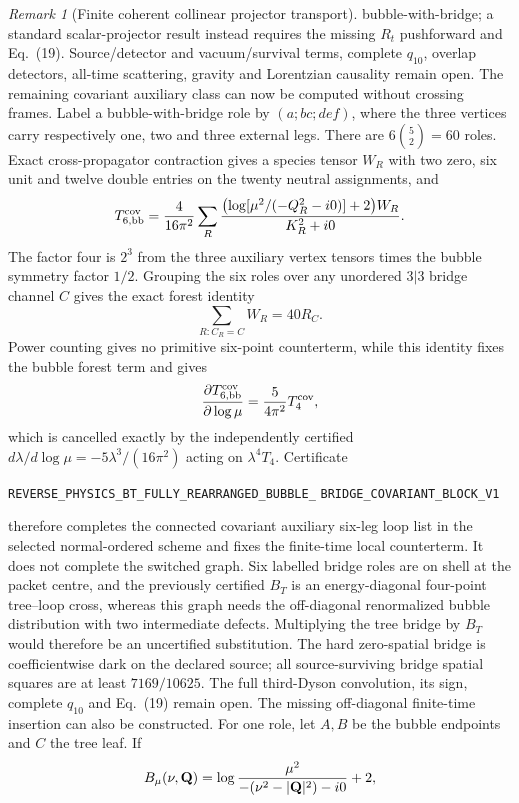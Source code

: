 \documentclass[11pt]{article}
\theoremstyle{definition}
\theoremstyle{remark}
\newtheorem{remark}[theorem]{Remark}
\begin{document}
\begin{remark}[Finite coherent collinear projector transport]
bubble-with-bridge; a standard scalar-projector result instead requires the
missing $R_t$ pushforward and Eq.~(19).  Source/detector and vacuum/survival
terms, complete $q_{10}$, overlap detectors, all-time scattering, gravity and
Lorentzian causality remain open.
The remaining covariant auxiliary class can now be computed without crossing
frames.  Label a bubble-with-bridge role by $(a;bc;def)$, where the three
vertices carry respectively one, two and three external legs.  There are
$6\binom52=60$ roles.  Exact cross-propagator contraction gives a species
tensor $W_R$ with two zero, six unit and twelve double entries on the twenty
neutral assignments, and
\[
 T_{6,\mathrm{bb}}^{\mathrm{cov}}
 ={4\over16\pi^2}\sum_R
 {\bigl(\log[\mu^2/(-Q_R^2-i0)]+2\bigr)W_R
  \over K_R^2+i0}.
\]
The factor four is $2^3$ from the three auxiliary vertex tensors times the
bubble symmetry factor $1/2$.  Grouping the six roles over any unordered
$3|3$ bridge channel $C$ gives the exact forest identity
\[
 \sum_{R:C_R=C}W_R=40R_C.
\]
Power counting gives no primitive six-point counterterm, while this identity
fixes the bubble forest term and gives
\[
 {\partial T_{6,\mathrm{bb}}^{\mathrm{cov}}\over\partial\log\mu}
 ={5\over4\pi^2}T_4^{\mathrm{cov}},
\]
which is cancelled exactly by the independently certified
$d\lambda/d\log\mu=-5\lambda^3/(16\pi^2)$ acting on
$\lambda^4T_4$.  Certificate
\par\noindent
\texttt{REVERSE\_PHYSICS\_BT\_FULLY\_REARRANGED\_BUBBLE\_}
\allowbreak\texttt{BRIDGE\_COVARIANT\_BLOCK\_V1}
\par\noindent
therefore completes the connected covariant auxiliary six-leg loop list in
the selected normal-ordered scheme and fixes the finite-time local
counterterm.  It does not complete the switched graph.  Six labelled bridge
roles are on shell at the packet centre, and the previously certified
$B_T$ is an energy-diagonal four-point tree--loop cross, whereas this graph
needs the off-diagonal renormalized bubble distribution with two intermediate
defects.  Multiplying the tree bridge by $B_T$ would therefore be an
uncertified substitution.  The hard zero-spatial bridge is coefficientwise
dark on the declared source; all source-surviving bridge spatial squares are
at least $7169/10625$.  The full third-Dyson convolution, its sign, complete
$q_{10}$ and Eq.~(19) remain open.
The missing off-diagonal finite-time insertion can also be constructed.  For
one role, let \(A,B\) be the bubble endpoints and \(C\) the tree leaf.  If
\[
 B_\mu(\nu,\mathbf Q)
 =\log{\mu^2\over-(\nu^2-|\mathbf Q|^2)-i0}+2,
\]
\end{remark}
\end{document}
